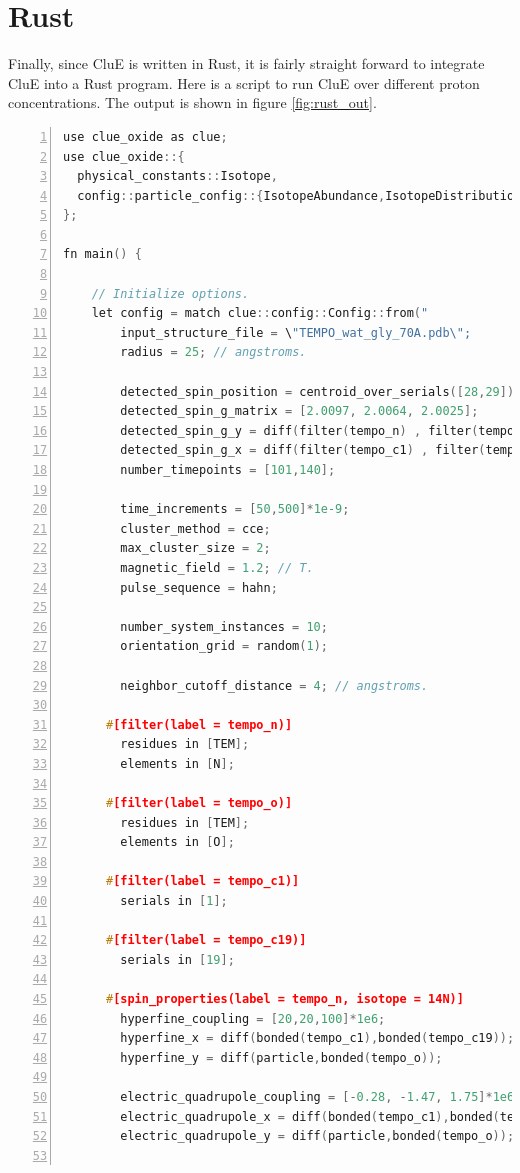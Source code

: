 \documentclass{book}
\begin{document}
\section{Rust}
Finally, since CluE is written in Rust, it is fairly straight forward to 
integrate CluE into a Rust program. 
Here is a script to run CluE over different proton concentrations.
The output is shown in figure \ref{fig:rust_out}.
\begin{lstlisting}[frame=single,numbers=left,language=c]
use clue_oxide as clue;
use clue_oxide::{
  physical_constants::Isotope,
  config::particle_config::{IsotopeAbundance,IsotopeDistribution}
};

fn main() {

    // Initialize options.
    let config = match clue::config::Config::from("
        input_structure_file = \"TEMPO_wat_gly_70A.pdb\";
        radius = 25; // angstroms.

        detected_spin_position = centroid_over_serials([28,29]);
        detected_spin_g_matrix = [2.0097, 2.0064, 2.0025];
        detected_spin_g_y = diff(filter(tempo_n) , filter(tempo_o) );
        detected_spin_g_x = diff(filter(tempo_c1) , filter(tempo_c19) );
        number_timepoints = [101,140];

        time_increments = [50,500]*1e-9;
        cluster_method = cce;
        max_cluster_size = 2;
        magnetic_field = 1.2; // T.
        pulse_sequence = hahn;

        number_system_instances = 10;
        orientation_grid = random(1);

        neighbor_cutoff_distance = 4; // angstroms.

      #[filter(label = tempo_n)]
        residues in [TEM];
        elements in [N];

      #[filter(label = tempo_o)]
        residues in [TEM];
        elements in [O];

      #[filter(label = tempo_c1)]
        serials in [1];

      #[filter(label = tempo_c19)]
        serials in [19];

      #[spin_properties(label = tempo_n, isotope = 14N)]
        hyperfine_coupling = [20,20,100]*1e6;
        hyperfine_x = diff(bonded(tempo_c1),bonded(tempo_c19));
        hyperfine_y = diff(particle,bonded(tempo_o));

        electric_quadrupole_coupling = [-0.28, -1.47, 1.75]*1e6;
        electric_quadrupole_x = diff(bonded(tempo_c1),bonded(tempo_c19));
        electric_quadrupole_y = diff(particle,bonded(tempo_o));


\end{lstlisting}
\end{document}
